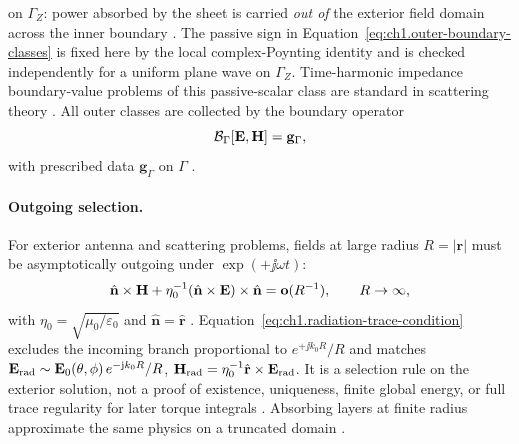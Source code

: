 on $\Gamma_Z$: power absorbed by the sheet is carried \emph{out of} the exterior field domain across the inner boundary \cite{stratton1941,harrington2001}. The passive sign in Equation~\eqref{eq:ch1.outer-boundary-classes} is fixed here by the local complex-Poynting identity and is checked independently for a uniform plane wave on $\Gamma_Z$. Time-harmonic impedance boundary-value problems of this passive-scalar class are standard in scattering theory \cite{colton1981impedance,harrington2001}. All outer classes are collected by the boundary operator
\begin{equation}
\label{eq:ch1.boundary-data-operator}
\mathcal{B}_\Gamma[\mathbf{E},\mathbf{H}]=\mathbf{g}_\Gamma,
\end{equation}
with prescribed data $\mathbf{g}_\Gamma$ on $\Gamma$ \cite{stratton1941}.
\label{eq:ch1.data-specification-tuple}

\paragraph{Outgoing selection.}
For exterior antenna and scattering problems, fields at large radius $R=|\mathbf{r}|$ must be asymptotically outgoing under $\exp(+\jj\omega t)$:
\begin{equation}
\label{eq:ch1.radiation-trace-condition}
\hat{\mathbf{n}}\times\mathbf{H}
+\eta_0^{-1}(\hat{\mathbf{n}}\times\mathbf{E})\times\hat{\mathbf{n}}
=\mathbf{o}(R^{-1}),\qquad R\to\infty,
\end{equation}
with $\eta_0=\sqrt{\mu_0/\varepsilon_0}$ and $\hat{\mathbf{n}}=\hat{\mathbf{r}}$ \cite{stratton1941,sommerfeld1949}. Equation~\eqref{eq:ch1.radiation-trace-condition} excludes the incoming branch proportional to $e^{+\jj k_0 R}/R$ and matches $\mathbf{E}_{\mathrm{rad}}\sim \mathbf{E}_0(\theta,\phi)\,e^{-\mathrm{j} k_0 R}/R$, $\mathbf{H}_{\mathrm{rad}}=\eta_0^{-1}\hat{\mathbf{r}}\times\mathbf{E}_{\mathrm{rad}}$. It is a selection rule on the exterior solution, not a proof of existence, uniqueness, finite global energy, or full trace regularity for later torque integrals \cite{harrington2001}. Absorbing layers at finite radius approximate the same physics on a truncated domain \cite{hansen1988}.

